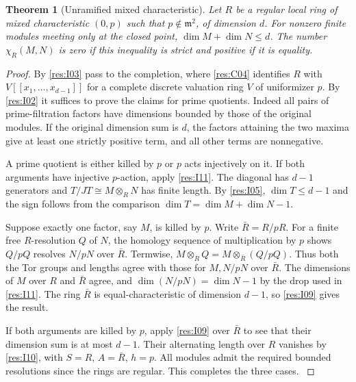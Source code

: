 \documentclass[11pt,oneside,openany]{book}
\newtheorem{theorem}{Theorem}[chapter]
\theoremstyle{definition}
\theoremstyle{remark}
\begin{document}
\begin{theorem}[Unramified mixed characteristic]\label{res:I12}
Let \(R\) be a regular local ring of mixed characteristic
\((0,p)\) such that \(p\notin\mathfrak m^2\), of dimension
\(d\). For nonzero finite modules meeting only at the closed
point, \(\dim M+\dim N\le d\). The number \(\chi_R(M,N)\)
is zero if this inequality is strict and positive if it is
equality.
\end{theorem}
\begin{proof}
By \ref{res:I03} pass to the completion, where \ref{res:C04}
identifies \(R\) with \(V[[x_1,\ldots,x_{d-1}]]\) for
a complete discrete valuation ring \(V\) of uniformizer \(p\).
By \ref{res:I02} it suffices to prove the claims for prime
quotients. Indeed all pairs of prime-filtration factors
have dimensions bounded by those of the original modules.
If the original dimension sum is \(d\), the factors attaining
the two maxima give at least one strictly positive term, and
all other terms are nonnegative.

A prime quotient is either killed by \(p\) or \(p\) acts
injectively on it. If both arguments have injective \(p\)-action,
apply \ref{res:I11}. The diagonal has \(d-1\) generators and
\(T/JT\cong M\otimes_R N\) has finite length. By \ref{res:I05},
\(\dim T\le d-1\) and the sign follows from the comparison
\(\dim T=\dim M+\dim N-1\).

Suppose exactly one factor, say \(M\), is killed by \(p\).
Write \(\bar R=R/pR\). For a finite free \(R\)-resolution
\(Q\) of \(N\), the homology sequence of multiplication by \(p\)
shows \(Q/pQ\) resolves \(N/pN\) over \(\bar R\). Termwise,
\(M\otimes_R Q=M\otimes_{\bar R}(Q/pQ)\). Thus both the
Tor groups and lengths agree with those for \(M,N/pN\) over
\(\bar R\). The dimensions of \(M\) over \(R\) and \(\bar R\)
agree, and \(\dim(N/pN)=\dim N-1\) by the drop used in
\ref{res:I11}. The ring \(\bar R\) is equal-characteristic
of dimension \(d-1\), so \ref{res:I09} gives the result.

If both arguments are killed by \(p\), apply \ref{res:I09}
over \(\bar R\) to see that their dimension sum is at most
\(d-1\). Their alternating length over \(R\) vanishes by
\ref{res:I10}, with \(S=R\), \(A=\bar R\), \(h=p\).
All modules admit the required bounded resolutions since the
rings are regular. This completes the three cases.
\cite[Chapter V, \S B.5, Theorem 2]{serre-local}
\end{proof}
\end{document}
